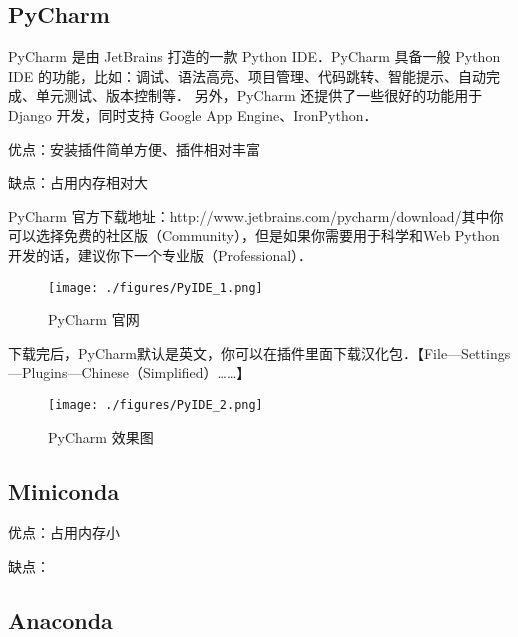 
\begin{issues}
\issueTODO
\end{issues}

\subsection{PyCharm}

PyCharm 是由 JetBrains 打造的一款 Python IDE．PyCharm 具备一般 Python IDE 的功能，比如：调试、语法高亮、项目管理、代码跳转、智能提示、自动完成、单元测试、版本控制等． 另外，PyCharm 还提供了一些很好的功能用于 Django 开发，同时支持 Google App Engine、IronPython．

优点：安装插件简单方便、插件相对丰富

缺点：占用内存相对大

PyCharm 官方下载地址：http://www.jetbrains.com/pycharm/download/其中你可以选择免费的社区版（Community），但是如果你需要用于科学和Web Python开发的话，建议你下一个专业版（Professional）．

\begin{figure}[ht]
\centering
\texttt{[image: ./figures/PyIDE\_1.png]}
\caption{PyCharm 官网} \label{PyIDE_fig1}
\end{figure}

下载完后，PyCharm默认是英文，你可以在插件里面下载汉化包．【File—Settings—Plugins—Chinese（Simplified）……】

\begin{figure}[ht]
\centering
\texttt{[image: ./figures/PyIDE\_2.png]}
\caption{PyCharm 效果图} \label{PyIDE_fig2}
\end{figure}

\subsection{Miniconda}

优点：占用内存小

缺点：

\subsection{Anaconda}
